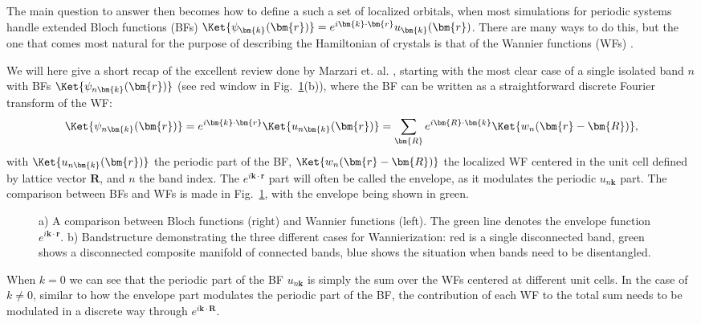 The main question to answer then becomes how to define a such a set of localized orbitals, when most simulations for periodic systems handle extended Bloch functions (BFs) $\Ket{\psi_{\bm{k}}(\bm{r})} = e^{i\bm{k}\cdot\bm{r}} u_{\bm{k}}(\bm{r})$.
There are many ways to do this, but the one that comes most natural for the purpose of describing the Hamiltonian of crystals is that of the Wannier functions (WFs) \cite{Wannier1937}.

We will here give a short recap of the excellent review done by Marzari et. al. \cite{Marzari2012}, starting with the most clear case of a single isolated band $n$ with BFs $\Ket{\psi_{n\bm{k}}(\bm{r})}$ (see red window in Fig.~\ref{fig:Theory_blochvswan}(b)), where the BF can be written as a straightforward discrete Fourier transform of the WF: 
\begin{equation}
	\label{eq:Theory_1bandwan}
	\Ket{\psi_{n\bm{k}}(\bm{r})} = e^{i\bm{k}\cdot\bm{r}} \Ket{u_{n\bm{k}}(\bm{r})} = \sum_{\bm{R}} e^{i \bm{R} \cdot \bm{k}} \Ket{w_n(\bm{r}-\bm{R})},
\end{equation}
with $\Ket{u_{n\bm{k}}(\bm{r})}$ the periodic part of the BF, $\Ket{w_n(\bm{r}-\bm{R})}$ the localized WF centered in the unit cell defined by lattice vector $\bm{R}$, and $n$ the band index.
The $e^{i\bm{k}\cdot\bm{r}}$ part will often be called the envelope, as it modulates the periodic $u_{n\bm{k}}$ part.
The comparison between BFs and WFs is made in Fig.~\ref{fig:Theory_blochvswan}, with the envelope being shown in green.
\begin{figure}
	\begin{subfigure}{0.49\textwidth}
		\caption{}
	\end{subfigure}
	\begin{subfigure}{0.49\textwidth}
		\caption{}
	\end{subfigure}
	\caption{\label{fig:Theory_blochvswan} a) A comparison between Bloch functions (right) and Wannier functions (left). The green line denotes the envelope function $e^{i\bm{k}\cdot\bm{r}}$. b) Bandstructure demonstrating the three different cases for Wannierization: red is a single disconnected band, green shows a disconnected composite manifold of connected bands, blue shows the situation when bands need to be disentangled.}
\end{figure}
When $k=0$ we can see that the periodic part of the BF $u_{n\bm{k}}$ is simply the sum over the WFs centered at different unit cells.
In the case of $k \neq 0$, similar to how the envelope part modulates the periodic part of the BF, the contribution of each WF to the total sum needs to be modulated in a discrete way through $e^{i \bm{k} \cdot \bm{R}}$.

